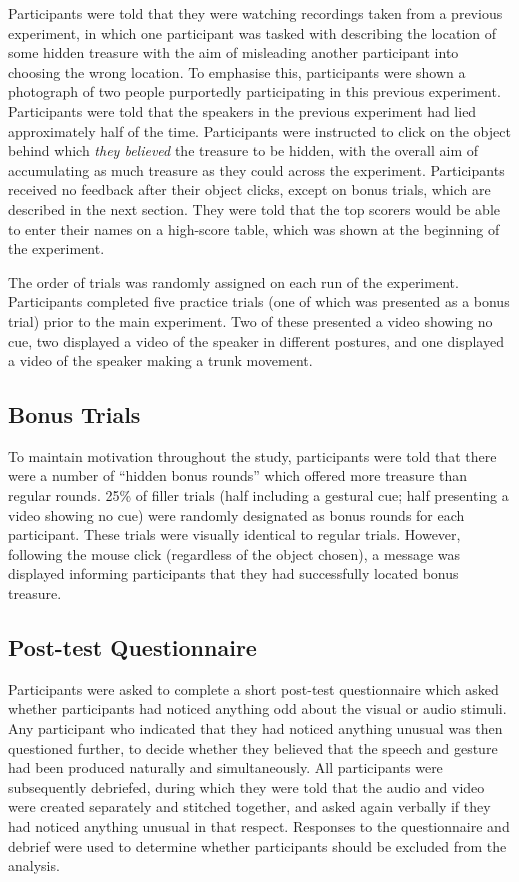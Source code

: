 \documentclass[a4paper,man,natbib]{apa6}
\begin{document}
Participants were told that they were watching recordings taken from a previous experiment, in which one participant was tasked with describing the location of some hidden treasure with the aim of misleading another participant into choosing the wrong location.
To emphasise this, participants were shown a photograph of two people purportedly participating in this previous experiment. 
Participants were told that the speakers in the previous experiment had lied approximately half of the time. 
Participants were instructed to click on the object behind which \textit{they believed} the treasure to be hidden, with the overall aim of accumulating as much treasure as they could across the experiment.
Participants received no feedback after their object clicks, except on bonus trials, which are described in the next section.
They were told that the top scorers would be able to enter their names on a high-score table, which was shown at the beginning of the experiment. 

The order of trials was randomly assigned on each run of the experiment.
Participants completed five practice trials (one of which was presented as a bonus trial) prior to the main experiment. 
Two of these presented a video showing no cue, two displayed a video of the speaker in different postures, and one displayed a video of the speaker making a trunk movement.


\subsection{Bonus Trials}
To maintain motivation throughout the study, participants were told that there were a number of ``hidden bonus rounds'' which offered more treasure than regular rounds.
25\% of filler trials (half including a gestural cue; half presenting a video showing no cue) were randomly designated as bonus rounds for each participant.
These trials were visually identical to regular trials.
However, following the mouse click (regardless of the object chosen), a message was displayed informing participants that they had successfully located bonus treasure.

\subsection{Post-test Questionnaire}
Participants were asked to complete a short post-test questionnaire which asked whether participants had noticed anything odd about the visual or audio stimuli.
Any participant who indicated that they had noticed anything unusual was then questioned further, to decide whether they believed that the speech and gesture had been produced naturally and simultaneously.
All participants were subsequently debriefed, during which they were told that the audio and video were created separately and stitched together, and asked again verbally if they had noticed anything unusual in that respect. 
Responses to the questionnaire and debrief were used to determine whether participants should be excluded from the analysis.
\end{document}
